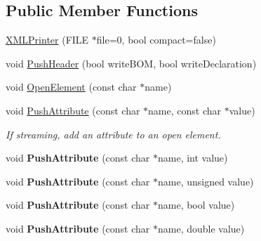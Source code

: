 \subsection*{Public Member Functions}
\begin{DoxyCompactItemize}
\item 
\hyperlink{classtinyxml2_1_1_x_m_l_printer_ad1eb8de568ceac1429cf04c66a349bd6}{X\-M\-L\-Printer} (F\-I\-L\-E $\ast$file=0, bool compact=false)
\item 
void \hyperlink{classtinyxml2_1_1_x_m_l_printer_a178c608ce8476043d5d6513819cde903}{Push\-Header} (bool write\-B\-O\-M, bool write\-Declaration)
\item 
void \hyperlink{classtinyxml2_1_1_x_m_l_printer_aa10d330818dbc31b44e9ffc27618bdfb}{Open\-Element} (const char $\ast$name)
\item 
\hypertarget{classtinyxml2_1_1_x_m_l_printer_a9a4e2c9348b42e147629d5a99f4af3f0}{void \hyperlink{classtinyxml2_1_1_x_m_l_printer_a9a4e2c9348b42e147629d5a99f4af3f0}{Push\-Attribute} (const char $\ast$name, const char $\ast$value)}\label{classtinyxml2_1_1_x_m_l_printer_a9a4e2c9348b42e147629d5a99f4af3f0}

\begin{DoxyCompactList}\small\item\em If streaming, add an attribute to an open element. \end{DoxyCompactList}\item 
\hypertarget{classtinyxml2_1_1_x_m_l_printer_a69120c82088597372d28d0a98f2ee7a1}{void {\bfseries Push\-Attribute} (const char $\ast$name, int value)}\label{classtinyxml2_1_1_x_m_l_printer_a69120c82088597372d28d0a98f2ee7a1}

\item 
\hypertarget{classtinyxml2_1_1_x_m_l_printer_aa41039e51990aaf5342f3e0575a692c4}{void {\bfseries Push\-Attribute} (const char $\ast$name, unsigned value)}\label{classtinyxml2_1_1_x_m_l_printer_aa41039e51990aaf5342f3e0575a692c4}

\item 
\hypertarget{classtinyxml2_1_1_x_m_l_printer_a51f7950d7b7a19f0d3a0d549a318d45f}{void {\bfseries Push\-Attribute} (const char $\ast$name, bool value)}\label{classtinyxml2_1_1_x_m_l_printer_a51f7950d7b7a19f0d3a0d549a318d45f}

\item 
\hypertarget{classtinyxml2_1_1_x_m_l_printer_a1714867af40e68ca404c3e84b6cac2a6}{void {\bfseries Push\-Attribute} (const char $\ast$name, double value)}\label{classtinyxml2_1_1_x_m_l_printer_a1714867af40e68ca404c3e84b6cac2a6}


\end{DoxyCompactItemize}
